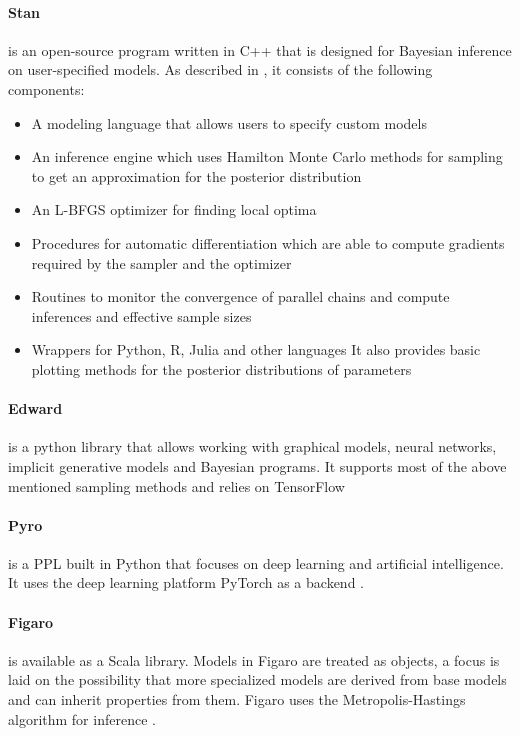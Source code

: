 \documentclass{article}
\begin{document}
\paragraph{Stan}
is an open-source program written in C++ that is designed for Bayesian inference on user-specified models. As described in \cite{Gelman_2015}, it consists of the following components:
\begin{itemize}
	\item A modeling language that allows users to specify custom models
	\item An inference engine which uses Hamilton Monte Carlo methods for sampling to get an approximation for the posterior distribution
	\item An L-BFGS optimizer for finding local optima
	\item Procedures for automatic differentiation which are able to compute gradients required by the sampler and the optimizer
	\item Routines to monitor the convergence of parallel chains and compute inferences and effective sample sizes
	\item Wrappers for Python, R, Julia and other languages
It also provides basic plotting methods for the posterior distributions of parameters
\end{itemize}
\paragraph{Edward}
is a python library that allows working with graphical models, neural networks, implicit generative models and Bayesian programs. It supports most of the above mentioned sampling methods and relies on TensorFlow \cite{tran2016edward}
\paragraph{Pyro}
is a PPL built in Python that focuses on deep learning and artificial intelligence. It uses the deep learning platform PyTorch as a backend \cite{bingham2018pyro}.
\paragraph{Figaro}
is available as a Scala library. Models in Figaro are treated as objects, a focus is laid on the possibility that more specialized models are derived from base models and can inherit properties from them. Figaro uses the Metropolis-Hastings algorithm for inference \cite{pfeffer2009figaro}.
\end{document}
